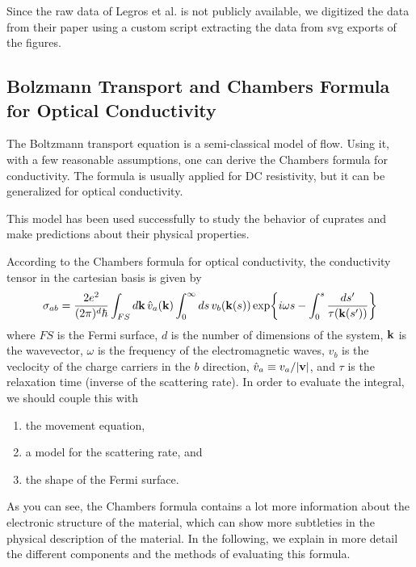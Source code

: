\documentclass[12pt]{article}
\begin{document}
Since the raw data of Legros et al. is not publicly available, we digitized the data from their
paper using a custom script extracting the data from svg exports of the figures.

\subsection{Bolzmann Transport and Chambers Formula for Optical Conductivity}
The Boltzmann transport equation is a semi-classical model of flow. Using it, with a few reasonable
assumptions, one can derive the Chambers formula for conductivity. The formula is usually applied
for DC resistivity, but it can be generalized for optical conductivity.

This model has been used successfully to study the behavior of cuprates and make predictions about
their physical properties\cite{grissonnanche2021}.

According to the Chambers formula for optical conductivity, the conductivity tensor in the cartesian
basis is given by
\begin{equation}
	\sigma_{ab} = \frac{2e^2}{(2\pi)^d\hbar}\int_{FS}\dd{\vb{k}}\hat{v}_a(\vb{k})
        \int_0^{\infty}\dd{s}v_b(\vb{k}(s))\exp{i\omega s
        - \int_0^s \frac{\mathop{ds'}}{\tau(\vb{k}(s'))}}
\end{equation}
where $FS$ is the Fermi surface, $d$ is the number of dimensions of the system, $\vb{k}$ is the
wavevector, $\omega$ is the frequency of the electromagnetic waves, $v_b$ is the veclocity of the
charge carriers in the $b$ direction, $\hat{v}_a\equiv v_a/\abs{\vb{v}}$, and $\tau$ is the
relaxation time (inverse of the scattering rate). In order to evaluate the integral, we should
couple this with
\begin{enumerate}
    \item the movement equation,
    \item a model for the scattering rate, and
    \item the shape of the Fermi surface.
\end{enumerate}

As you can see, the Chambers formula contains a lot more information about the electronic structure
of the material, which can show more subtleties in the physical description of the material.
In the following, we explain in more detail the different components and the methods of evaluating
this formula.
\end{document}
